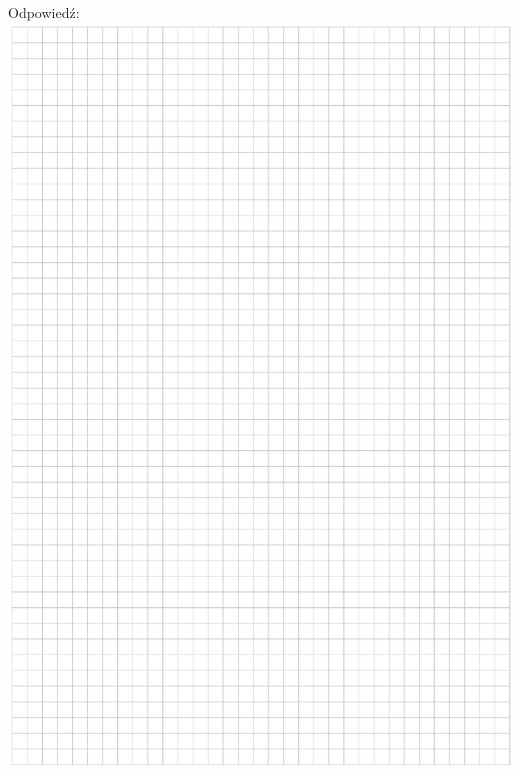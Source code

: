 \documentclass[10pt]{article}
\begin{document}
Odpowiedź:\\
\includegraphics[max width=\textwidth, center]{2024_11_21_603d5c1b2a7d8d68f45fg-19}
\end{document}
